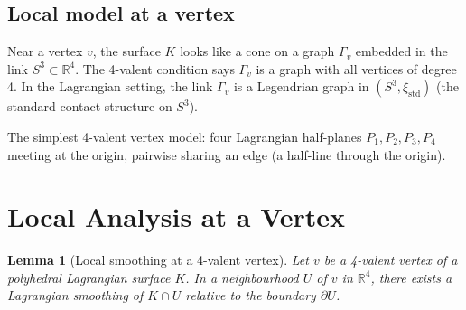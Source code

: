 \documentclass[12pt]{article}
\newtheorem{lemma}[theorem]{Lemma}
\theoremstyle{definition}
\theoremstyle{remark}
\newcommand{\bR}{\mathbb{R}}
\begin{document}
\subsection{Local model at a vertex}

Near a vertex $v$, the surface $K$ looks like a cone on a graph $\Gamma_v$
embedded in the link $S^3\subset\bR^4$.  The 4-valent condition says $\Gamma_v$
is a graph with all vertices of degree 4.  In the Lagrangian setting, the link
$\Gamma_v$ is a Legendrian graph in $(S^3, \xi_{\mathrm{std}})$ (the standard
contact structure on $S^3$).

The simplest 4-valent vertex model: four Lagrangian half-planes $P_1,P_2,P_3,P_4$
meeting at the origin, pairwise sharing an edge (a half-line through the origin).

\section{Local Analysis at a Vertex}

\begin{lemma}[Local smoothing at a 4-valent vertex]\label{lem:local}
Let $v$ be a 4-valent vertex of a polyhedral Lagrangian surface $K$.  In a
neighbourhood $U$ of $v$ in $\bR^4$, there exists a Lagrangian smoothing of
$K\cap U$ relative to the boundary $\partial U$.
\end{lemma}
\end{document}
